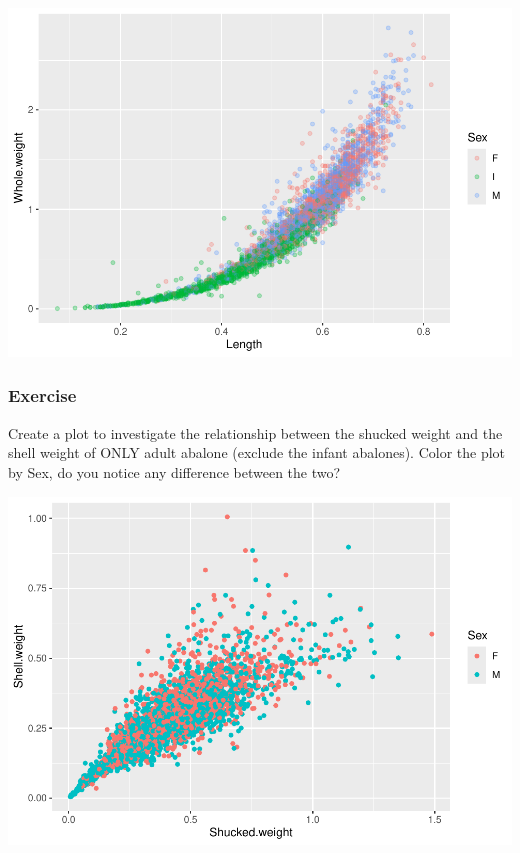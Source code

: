 \documentclass[
]{book}
\newenvironment{Shaded}{\begin{snugshade}}{\end{snugshade}}
\newcommand{\AttributeTok}[1]{\textcolor[rgb]{0.13,0.29,0.53}{#1}}
\newcommand{\FunctionTok}[1]{\textcolor[rgb]{0.13,0.29,0.53}{\textbf{#1}}}
\newcommand{\NormalTok}[1]{#1}
\newcommand{\OtherTok}[1]{\textcolor[rgb]{0.56,0.35,0.01}{#1}}
\newcommand{\SpecialCharTok}[1]{\textcolor[rgb]{0.81,0.36,0.00}{\textbf{#1}}}
\newcommand{\StringTok}[1]{\textcolor[rgb]{0.31,0.60,0.02}{#1}}
\begin{document}
\includegraphics{_main_files/figure-latex/unnamed-chunk-46-1.pdf}

\subsubsection{Exercise}\label{exercise-2}

Create a plot to investigate the relationship between the shucked weight and the shell weight of ONLY adult abalone (exclude the infant abalones). Color the plot by Sex, do you notice any difference between the two?

\begin{Shaded}
\end{Shaded}

\includegraphics{_main_files/figure-latex/unnamed-chunk-47-1.pdf}
\end{document}
